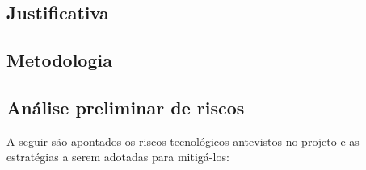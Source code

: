 
\subsection{Justificativa}
\label{ssec:just}

\subsection{Metodologia}
\label{ssec:metod}


\subsection{Análise preliminar de riscos}
\label{ssec:risco}
A seguir são apontados os riscos tecnológicos antevistos no projeto e as estratégias a serem adotadas para mitigá-los: 
